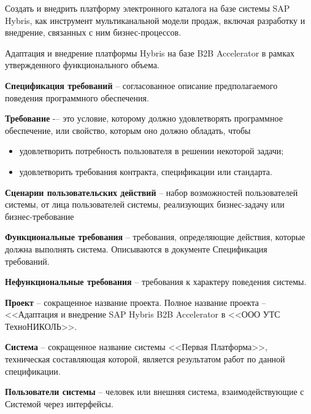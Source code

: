 




	
	Создать и внедрить платформу электронного каталога на базе системы SAP Hybris, как инструмент мультиканальной модели продаж, включая разработку и внедрение, связанных с ним бизнес-процессов.
	

	Адаптация и внедрение платформы Hybris на базе B2B Accelerator в рамках утвержденного функционального объема. 	


\textbf{Спецификация требований} -- согласованное описание предполагаемого поведения программного обеспечения.

\textbf{Требование} -– это условие, которому должно удовлетворять программное обеспечение, или свойство, которым оно должно обладать, чтобы 
\begin{itemize}
\item удовлетворить потребность пользователя в решении некоторой задачи; 
\item удовлетворить требования контракта, спецификации или стандарта. 
\end{itemize}


\textbf{Сценарии пользовательских действий} -- набор возможностей пользователей системы, от лица пользователей системы, реализующих бизнес-задачу или бизнес-требование

\textbf{Функциональные требования} -- требования, определяющие действия, которые должна выполнять система. Описываются в документе Спецификация требований.

\textbf{Нефункциональные требования} -- требования к характеру поведения системы.

\textbf{Проект} -- сокращенное название проекта. Полное название проекта -- <<Адаптация и внедрение SAP Hybris B2B Accelerator в <<ООО УТС ТехноНИКОЛЬ>>. 

\textbf{Система} -- сокращенное название системы <<Первая Платформа>>, техническая составляющая которой, является результатом работ по данной спецификации.

\textbf{Пользователи системы} -- человек или внешняя система, взаимодействующие с Системой через интерфейсы.

